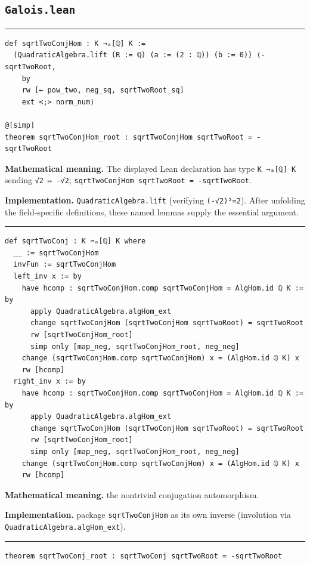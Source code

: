 \documentclass[UTF8,a4paper,11pt,fontset=fandol]{ctexart}
\theoremstyle{definition}
\newcommand{\statementsep}{\par\medskip\hrule\medskip}
\begin{document}
\subsection{\texttt{Galois.lean}}

\statementsep
\begin{verbatim}
def sqrtTwoConjHom : K →ₐ[ℚ] K :=
  (QuadraticAlgebra.lift (R := ℚ) (a := (2 : ℚ)) (b := 0)) ⟨-sqrtTwoRoot,
    by
    rw [← pow_two, neg_sq, sqrtTwoRoot_sq]
    ext <;> norm_num⟩

@[simp]
theorem sqrtTwoConjHom_root : sqrtTwoConjHom sqrtTwoRoot = -sqrtTwoRoot
\end{verbatim}
\noindent\textbf{Mathematical meaning.} The displayed Lean declaration has type \texttt{K →ₐ[ℚ] K} sending \texttt{√2 ↦ -√2}; \texttt{sqrtTwoConjHom sqrtTwoRoot = -sqrtTwoRoot}.\par
\noindent\textbf{Implementation.} \texttt{QuadraticAlgebra.\allowbreak{}lift} (verifying \texttt{(-√2)²=2}). After unfolding the field-specific definitions, these named lemmas supply the essential argument.\par
\statementsep
\begin{verbatim}
def sqrtTwoConj : K ≃ₐ[ℚ] K where
  __ := sqrtTwoConjHom
  invFun := sqrtTwoConjHom
  left_inv x := by
    have hcomp : sqrtTwoConjHom.comp sqrtTwoConjHom = AlgHom.id ℚ K := by
      apply QuadraticAlgebra.algHom_ext
      change sqrtTwoConjHom (sqrtTwoConjHom sqrtTwoRoot) = sqrtTwoRoot
      rw [sqrtTwoConjHom_root]
      simp only [map_neg, sqrtTwoConjHom_root, neg_neg]
    change (sqrtTwoConjHom.comp sqrtTwoConjHom) x = (AlgHom.id ℚ K) x
    rw [hcomp]
  right_inv x := by
    have hcomp : sqrtTwoConjHom.comp sqrtTwoConjHom = AlgHom.id ℚ K := by
      apply QuadraticAlgebra.algHom_ext
      change sqrtTwoConjHom (sqrtTwoConjHom sqrtTwoRoot) = sqrtTwoRoot
      rw [sqrtTwoConjHom_root]
      simp only [map_neg, sqrtTwoConjHom_root, neg_neg]
    change (sqrtTwoConjHom.comp sqrtTwoConjHom) x = (AlgHom.id ℚ K) x
    rw [hcomp]
\end{verbatim}
\noindent\textbf{Mathematical meaning.} the nontrivial conjugation automorphism.\par
\noindent\textbf{Implementation.} package \texttt{sqrtTwoConjHom} as its own inverse (involution via \texttt{QuadraticAlgebra.\allowbreak{}algHom\_\allowbreak{}ext}).\par
\statementsep
\begin{verbatim}
theorem sqrtTwoConj_root : sqrtTwoConj sqrtTwoRoot = -sqrtTwoRoot
\end{verbatim}
\end{document}
